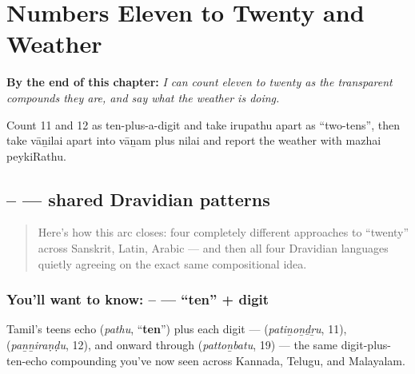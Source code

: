 
\chapter{Numbers Eleven to Twenty and Weather}
\label{ch:ta-numbers-and-weather}

\begin{chapteropening}
\textbf{By the end of this chapter:} \emph{I can count eleven to twenty as the transparent compounds they are, and say what the weather is doing.}

Count 11 and 12 as ten-plus-a-digit and take irupathu apart as \textquotedblleft{}two-tens\textquotedblright{}, then take vāṉilai apart into vāṉam plus nilai and report the weather with mazhai peykiRathu.
\end{chapteropening}

\section[\texorpdfstring{\ta{பதினொன்று} — \ta{இருபது} (patiṉoṉḏṟu …)}{பதினொன்று — இருபது (patiṉoṉḏṟu …)}]{– — shared Dravidian patterns}

\label{lesson:TA-C20-pathinondru-irupathu}



\begin{quote}
Here's how this arc closes: four completely different approaches to \textquotedblleft{}twenty\textquotedblright{} across Sanskrit, Latin, Arabic — and then all four Dravidian languages quietly agreeing on the exact same compositional idea.
\end{quote}

\subsection*{You'll want to know: – — \textquotedblleft{}ten\textquotedblright{} + digit}
Tamil's teens echo \textbf{} (\emph{pathu}, \textquotedblleft{}\textbf{ten}\textquotedblright{}) plus each digit — \textbf{} (\emph{patiṉoṉḏṟu}, 11), \textbf{} (\emph{paṉṉiraṇḍu}, 12), and onward through \textbf{} (\emph{pattoṉbatu}, 19) — the same digit-plus- ten-echo compounding you've now seen across Kannada, Telugu, and Malayalam.

